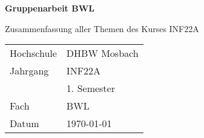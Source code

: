 \begin{titlepage}
\begin{center}
\vspace*{1cm}

\huge
\textbf{Gruppenarbeit BWL}

\vspace{1.5cm}

\Large
Zusammenfassung aller Themen des Kurses INF22A



\vfill

\normalsize
\begin{tabular}{ ll }
Hochschule & DHBW Mosbach\\
Jahrgang & INF22A\\
 & 1. Semester\\
Fach & BWL\\
Datum & \today{}
\end{tabular}


    
\end{center}
\end{titlepage}
